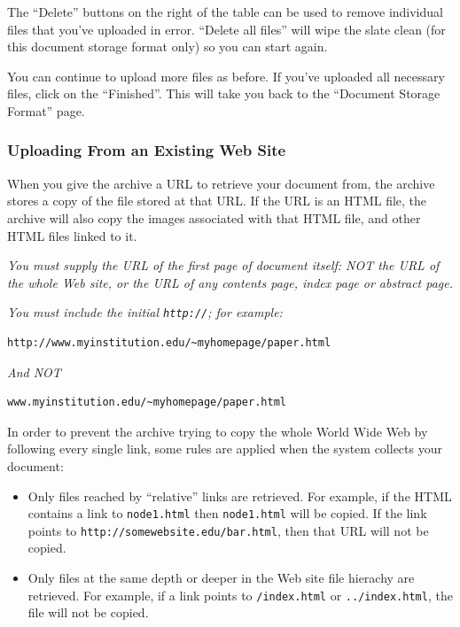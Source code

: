 The ``Delete'' buttons on the right of the table can be used to remove individual files that you've uploaded in error. ``Delete all files'' will wipe the slate clean (for this document storage format only) so you can start again.

You can continue to upload more files as before. If you've uploaded all necessary files, click on the ``Finished''. This will take you back to the ``Document Storage Format'' page.


\subsubsection{Uploading From an Existing Web Site}

When you give the archive a URL to retrieve your document from, the archive stores a copy of the file stored at that URL. If the URL is an HTML file, the archive will also copy the images associated with that HTML file, and other HTML files linked to it.

\emph{You must supply the URL of the first page of document itself: NOT the URL of the whole Web site, or the URL of any contents page, index page or abstract page.}

\emph{You must include the initial {\tt http://}; for example:}

\begin{verbatim}
http://www.myinstitution.edu/~myhomepage/paper.html
\end{verbatim}

\emph{And NOT}
\begin{verbatim}
www.myinstitution.edu/~myhomepage/paper.html
\end{verbatim}

In order to prevent the archive trying to copy the whole World Wide Web by following every single link, some rules are applied when the system collects your document:

\begin{itemize}
\item Only files reached by ``relative'' links are retrieved. For example, if the HTML contains a link to {\tt node1.html} then {\tt node1.html} will be copied. If the link points to {\tt http://somewebsite.edu/bar.html}, then that URL will not be copied.
\item Only files at the same depth or deeper in the Web site file hierachy are retrieved. For example, if a link points to {\tt /index.html} or {\tt ../index.html}, the file will not be copied.
\end{itemize}

